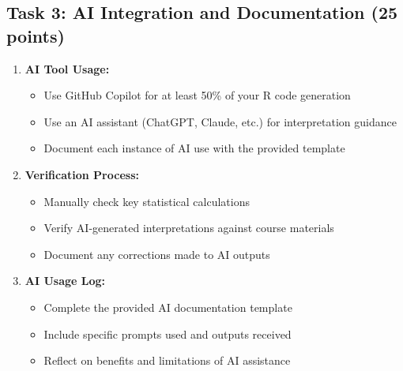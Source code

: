 \documentclass[11pt]{article}
\begin{document}
\subsection{Task 3: AI Integration and Documentation (25 points)}
\begin{enumerate}
\item \textbf{AI Tool Usage:}
   \begin{itemize}
   \item Use GitHub Copilot for at least 50\% of your R code generation
   \item Use an AI assistant (ChatGPT, Claude, etc.) for interpretation guidance
   \item Document each instance of AI use with the provided template
   \end{itemize}

\item \textbf{Verification Process:}
   \begin{itemize}
   \item Manually check key statistical calculations
   \item Verify AI-generated interpretations against course materials
   \item Document any corrections made to AI outputs
   \end{itemize}

\item \textbf{AI Usage Log:}
   \begin{itemize}
   \item Complete the provided AI documentation template
   \item Include specific prompts used and outputs received
   \item Reflect on benefits and limitations of AI assistance
   \end{itemize}
\end{enumerate}
\end{document}
